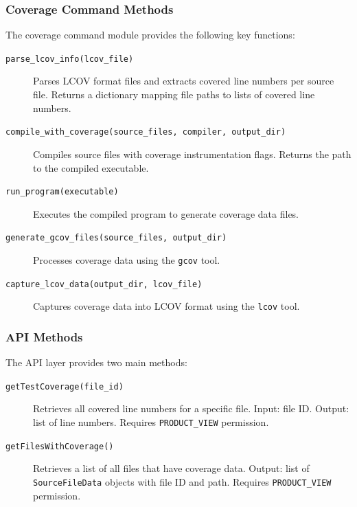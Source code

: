 \subsubsection{Coverage Command Methods}

The coverage command module provides the following key functions:

\begin{description}
    \item[\texttt{parse\_lcov\_info(lcov\_file)}] Parses LCOV format files and extracts covered line numbers per source file. Returns a dictionary mapping file paths to lists of covered line numbers.
    
    \item[\texttt{compile\_with\_coverage(source\_files, compiler, output\_dir)}] Compiles source files with coverage instrumentation flags. Returns the path to the compiled executable.
    
    \item[\texttt{run\_program(executable)}] Executes the compiled program to generate coverage data files.
    
    \item[\texttt{generate\_gcov\_files(source\_files, output\_dir)}] Processes coverage data using the \texttt{gcov} tool.
    
    \item[\texttt{capture\_lcov\_data(output\_dir, lcov\_file)}] Captures coverage data into LCOV format using the \texttt{lcov} tool.
\end{description}

\subsubsection{API Methods}

The API layer provides two main methods:

\begin{description}
    \item[\texttt{getTestCoverage(file\_id)}] Retrieves all covered line numbers for a specific file. Input: file ID. Output: list of line numbers. Requires \texttt{PRODUCT\_VIEW} permission.
    
    \item[\texttt{getFilesWithCoverage()}] Retrieves a list of all files that have coverage data. Output: list of \texttt{SourceFileData} objects with file ID and path. Requires \texttt{PRODUCT\_VIEW} permission.
\end{description}

